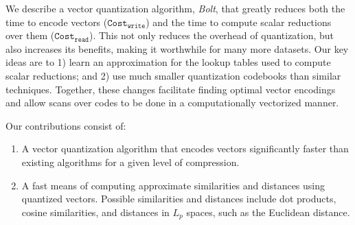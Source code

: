 We describe a vector quantization algorithm, \textit{Bolt}, that greatly reduces both the time to encode vectors ($\texttt{Cost}_{\texttt{write}}$) and the time to compute scalar reductions over them ($\texttt{Cost}_{\texttt{read}}$). This not only reduces the overhead of quantization, but also increases its benefits, making it worthwhile for many more datasets. Our key ideas are to 1) learn an approximation for the lookup tables used to compute scalar reductions; and 2) use much smaller quantization codebooks than similar techniques. Together, these changes facilitate finding optimal vector encodings and allow scans over codes to be done in a computationally vectorized manner.

Our contributions consist of:
\begin{enumerate}
\item A vector quantization algorithm that encodes vectors significantly faster than existing algorithms for a given level of compression.
\item A fast means of computing approximate similarities and distances using quantized vectors. Possible similarities and distances include dot products, cosine similarities, and distances in $L_p$ spaces, such as the Euclidean distance.
\end{enumerate}









